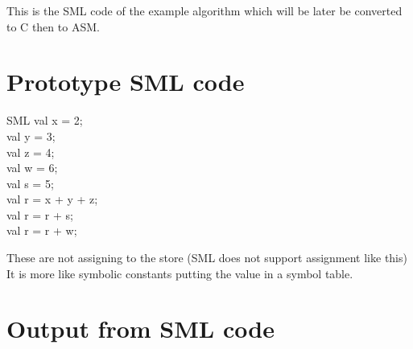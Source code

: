 \documentclass{article}
\begin{document}
This is the SML code of the example algorithm which will be later be converted to C then to ASM. 
\section*{Prototype SML code}
\begin{GFT}{SML}
\+val x = 2;\\
\+val y = 3;\\
\+val z = 4;\\
\+val w = 6;\\
\+val s = 5;\\
\+val r = x + y + z;\\
\+val r = r + s;\\
\+val r = r + w;\\
\end{GFT}
These are not assigning to the store (SML does not support assignment like this)
It is more like symbolic constants putting the value in a symbol table. 
\section*{Output from SML code}

\clearpage
\end{document}
